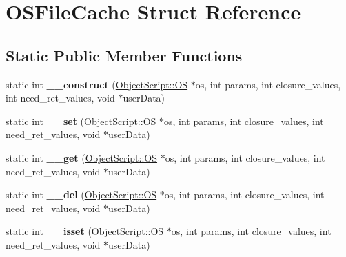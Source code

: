 \hypertarget{struct_o_s_file_cache}{}\section{O\+S\+File\+Cache Struct Reference}
\label{struct_o_s_file_cache}
\subsection*{Static Public Member Functions}
\begin{DoxyCompactItemize}
\item 
static int {\bfseries \+\_\+\+\_\+construct} (\hyperlink{class_object_script_1_1_o_s}{Object\+Script\+::\+OS} $\ast$os, int params, int closure\+\_\+values, int need\+\_\+ret\+\_\+values, void $\ast$user\+Data)\hypertarget{struct_o_s_file_cache_ab654dd62dd51f8add7414ea74f77eec4}{}\label{struct_o_s_file_cache_ab654dd62dd51f8add7414ea74f77eec4}

\item 
static int {\bfseries \+\_\+\+\_\+set} (\hyperlink{class_object_script_1_1_o_s}{Object\+Script\+::\+OS} $\ast$os, int params, int closure\+\_\+values, int need\+\_\+ret\+\_\+values, void $\ast$user\+Data)\hypertarget{struct_o_s_file_cache_aaa039e286a2dd2723bbe2f091bac3373}{}\label{struct_o_s_file_cache_aaa039e286a2dd2723bbe2f091bac3373}

\item 
static int {\bfseries \+\_\+\+\_\+get} (\hyperlink{class_object_script_1_1_o_s}{Object\+Script\+::\+OS} $\ast$os, int params, int closure\+\_\+values, int need\+\_\+ret\+\_\+values, void $\ast$user\+Data)\hypertarget{struct_o_s_file_cache_a6951cf41cbea2da9f2843c5a7d0e25eb}{}\label{struct_o_s_file_cache_a6951cf41cbea2da9f2843c5a7d0e25eb}

\item 
static int {\bfseries \+\_\+\+\_\+del} (\hyperlink{class_object_script_1_1_o_s}{Object\+Script\+::\+OS} $\ast$os, int params, int closure\+\_\+values, int need\+\_\+ret\+\_\+values, void $\ast$user\+Data)\hypertarget{struct_o_s_file_cache_aa3ae728595404d0e7bce89335eed2ddc}{}\label{struct_o_s_file_cache_aa3ae728595404d0e7bce89335eed2ddc}

\item 
static int {\bfseries \+\_\+\+\_\+isset} (\hyperlink{class_object_script_1_1_o_s}{Object\+Script\+::\+OS} $\ast$os, int params, int closure\+\_\+values, int need\+\_\+ret\+\_\+values, void $\ast$user\+Data)\hypertarget{struct_o_s_file_cache_a7927e0fb59849ddb717963d1fd9c8307}{}\label{struct_o_s_file_cache_a7927e0fb59849ddb717963d1fd9c8307}


\end{DoxyCompactItemize}
